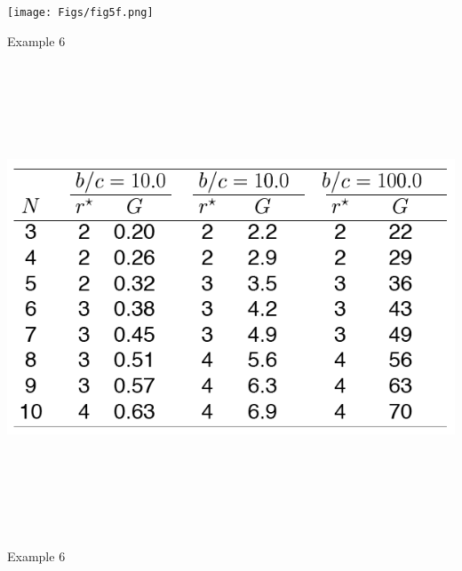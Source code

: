 \documentclass[12pt]{article}
\newcommand{\headsize}{\fontsize{35}{35} \selectfont}
\begin{document}
\vspace{30mm}

\centerline{\texttt{[image: Figs/fig5f.png]}}


\newpage

\headsize \color{yellow}
\hfill \begin{minipage}{5.75in}
\centering
Example 6
\end{minipage}

\vspace{30mm}

\centerline{\includegraphics[height=5.5in]{Figs/tableA.png}}


\newpage


\headsize \color{yellow}
\hfill \begin{minipage}{5.75in}
\centering
Example 6
\end{minipage}

\vspace{30mm}
\end{document}

